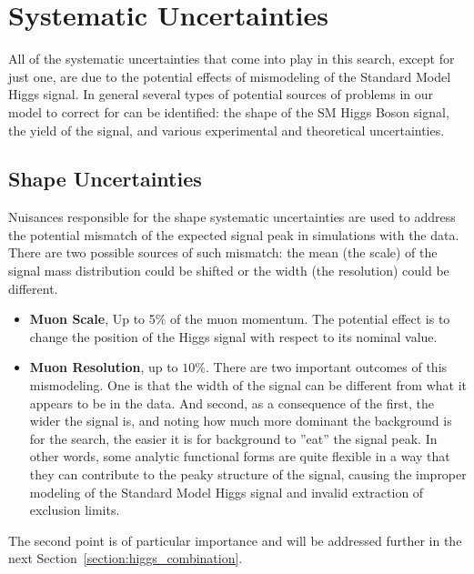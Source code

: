 \section{Systematic Uncertainties} \label{section:higgs_systematics}
All of the systematic uncertainties that come into play in this search, except for just one, are due to the potential effects of mismodeling of the Standard Model Higgs signal. In general several types of potential sources of problems in our model to correct for can be identified: the shape of the SM Higgs Boson signal, the yield of the signal, and various experimental and theoretical uncertainties.

\subsection{Shape Uncertainties}
Nuisances responsible for the shape systematic uncertainties are used to address the potential mismatch of the expected signal peak in simulations with the data. There are two possible sources of such mismatch: the mean (the scale) of the signal mass distribution could be shifted or the width (the resolution) could be different.
\begin{itemize}
    \item {\bf Muon Scale}, Up to 5\% of the muon momentum. The potential effect is to change the position of the Higgs signal with respect to its nominal value.
    \item {\bf Muon Resolution}, up to $10\%$. There are two important outcomes of this mismodeling. One is that the width of the signal can be different from what it appears to be in the data. And second, as a consequence of the first, the wider the signal is, and noting how much more dominant the background is for the search, the easier it is for background to ''eat'' the signal peak. In other words, some analytic functional forms are quite flexible in a way that they can contribute to the peaky structure of the signal, causing the improper modeling of the Standard Model Higgs signal and invalid extraction of exclusion limits.
\end{itemize}
The second point is of particular importance and will be addressed further in the next Section~\ref{section:higgs_combination}.

